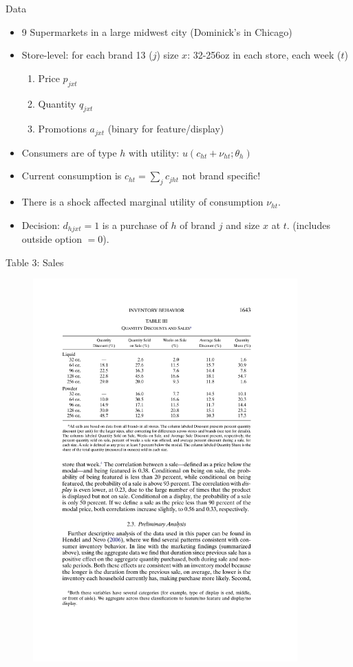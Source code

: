 \documentclass[xcolor=pdftex,dvipsnames,table,mathserif,aspectratio=169]{beamer}
\begin{document}
\begin{frame}{Data}
\begin{itemize}
\item 9 Supermarkets in a large midwest city (Dominick's in Chicago)
\item Store-level: for each brand 13 ($j$) size $x$: 32-256oz in each store, each week ($t$)
\begin{enumerate}
\item Price $p_{jxt}$ 
\item Quantity $q_{jxt}$
\item Promotions $a_{jxt}$ (binary for feature/display)
\end{enumerate}
\item Consumers are of type $h$ with utility: $u(c_{ht} + \nu_{ht}; \theta_h)$
\item Current consumption is $c_{ht} = \sum_j c_{jht}$ \alert{not brand specific!}
\item There is a shock affected marginal utility of consumption $\nu_{ht}$.
\item Decision: $d_{hjxt} = 1$ is a purchase of $h$ of brand $j$ and size $x$ at $t$. (includes outside option $=0$).
\end{itemize}
\end{frame}

\begin{frame}{Table 3: Sales}
\begin{figure}[htbp]
\begin{center}
\includegraphics[width=4in]{resources/hntable3.pdf}
\label{gandr1}
\end{center}
\end{figure}
\end{frame}
\end{document}
